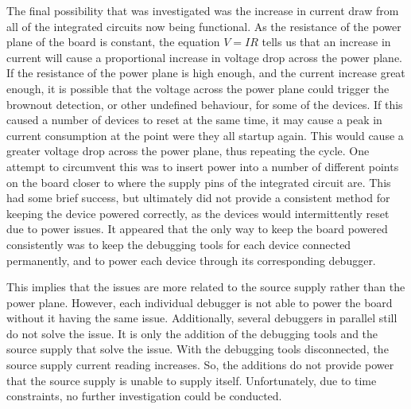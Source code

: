 The final possibility that was investigated was the increase in current draw from all of the integrated circuits now being functional.
As the resistance of the power plane of the board is constant,
the equation \(V = IR\) tells us that an increase in current will cause a proportional increase in voltage drop across the power plane.
If the resistance of the power plane is high enough, and the current increase great enough,
it is possible that the voltage across the power plane could trigger the brownout detection, or other undefined behaviour, for some of the devices.
If this caused a number of devices to reset at the same time, it may cause a peak in current consumption at the point were they all startup again.
This would cause a greater voltage drop across the power plane, thus repeating the cycle.
One attempt to circumvent this was to insert power into a number of different points on the board
closer to where the supply pins of the integrated circuit are.
This had some brief success, but ultimately did not provide a consistent method for keeping the device powered correctly,
as the devices would intermittently reset due to power issues.
It appeared that the only way to keep the board powered consistently was to keep the debugging tools for each device connected permanently,
and to power each device through its corresponding debugger.

This implies that the issues are more related to the source supply rather than the power plane.
However, each individual debugger is not able to power the board without it having the same issue.
Additionally, several debuggers in parallel still do not solve the issue.
It is only the addition of the debugging tools and the source supply that solve the issue.
With the debugging tools disconnected, the source supply current reading increases.
So, the additions do not provide power that the source supply is unable to supply itself.
Unfortunately, due to time constraints, no further investigation could be conducted.
